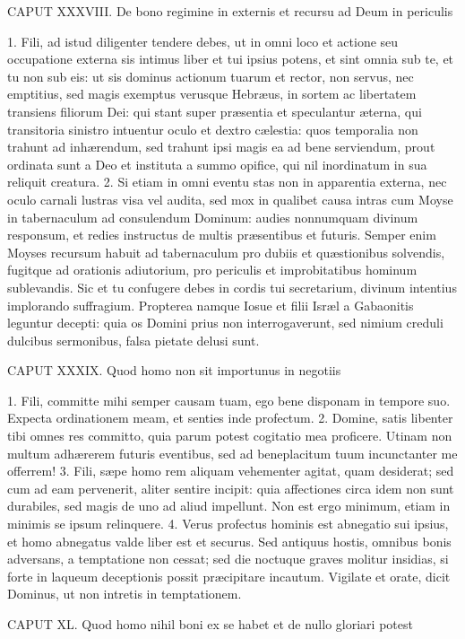 \documentclass[twoside]{article}
\begin{document}
CAPUT XXXVIII.
De bono regimine in externis et recursu ad Deum in periculis

1. Fili, ad istud diligenter tendere debes, ut in omni loco et actione seu occupatione externa sis intimus liber et tui ipsius potens, et sint omnia sub te, et tu non sub eis: ut sis dominus actionum tuarum et rector, non servus, nec emptitius, sed magis exemptus verusque Hebræus, in sortem ac libertatem transiens filiorum Dei: qui stant super præsentia et speculantur æterna, qui transitoria sinistro intuentur oculo et dextro cælestia: quos temporalia non trahunt ad inhærendum, sed trahunt ipsi magis ea ad bene serviendum, prout ordinata sunt a Deo et instituta a summo opifice, qui nil inordinatum in sua reliquit creatura.
2. Si etiam in omni eventu stas non in apparentia externa, nec oculo carnali lustras visa vel audita, sed mox in qualibet causa intras cum Moyse in tabernaculum ad consulendum Dominum: audies nonnumquam divinum responsum, et redies instructus de multis præsentibus et futuris. Semper enim Moyses recursum habuit ad tabernaculum pro dubiis et quæstionibus solvendis, fugitque ad orationis adiutorium, pro periculis et improbitatibus hominum sublevandis. Sic et tu confugere debes in cordis tui secretarium, divinum intentius implorando suffragium. Propterea namque Iosue et filii Isræl a Gabaonitis leguntur decepti: quia os Domini prius non interrogaverunt, sed nimium creduli dulcibus sermonibus, falsa pietate delusi sunt.


CAPUT XXXIX.
Quod homo non sit importunus in negotiis

1. Fili, committe mihi semper causam tuam, ego bene disponam in tempore suo. Expecta ordinationem meam, et senties inde profectum.
2. Domine, satis libenter tibi omnes res committo, quia parum potest cogitatio mea proficere. Utinam non multum adhærerem futuris eventibus, sed ad beneplacitum tuum incunctanter me offerrem!
3. Fili, sæpe homo rem aliquam vehementer agitat, quam desiderat; sed cum ad eam pervenerit, aliter sentire incipit: quia affectiones circa idem non sunt durabiles, sed magis de uno ad aliud impellunt. Non est ergo minimum, etiam in minimis se ipsum relinquere.
4. Verus profectus hominis est abnegatio sui ipsius, et homo abnegatus valde liber est et securus. Sed antiquus hostis, omnibus bonis adversans, a temptatione non cessat; sed die noctuque graves molitur insidias, si forte in laqueum deceptionis possit præcipitare incautum. Vigilate et orate, dicit Dominus, ut non intretis in temptationem.


CAPUT XL.
Quod homo nihil boni ex se habet et de nullo gloriari potest
\end{document}
